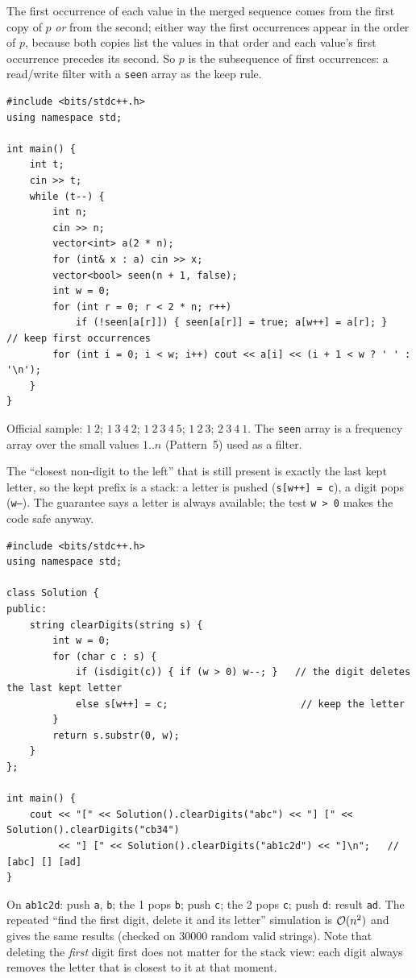 \begin{solutionbox}
The first occurrence of each value in the merged sequence comes from the first copy of $p$ \emph{or} from the second; either way the first occurrences appear in the order of $p$, because both copies list the values in that order and each value's first occurrence precedes its second. So $p$ is the subsequence of first occurrences: a read/write filter with a \texttt{seen} array as the keep rule.
\begin{lstlisting}[style=cpp]
#include <bits/stdc++.h>
using namespace std;

int main() {
    int t;
    cin >> t;
    while (t--) {
        int n;
        cin >> n;
        vector<int> a(2 * n);
        for (int& x : a) cin >> x;
        vector<bool> seen(n + 1, false);
        int w = 0;
        for (int r = 0; r < 2 * n; r++)
            if (!seen[a[r]]) { seen[a[r]] = true; a[w++] = a[r]; }   // keep first occurrences
        for (int i = 0; i < w; i++) cout << a[i] << (i + 1 < w ? ' ' : '\n');
    }
}
\end{lstlisting}
Official sample: $1\ 2$; $1\ 3\ 4\ 2$; $1\ 2\ 3\ 4\ 5$; $1\ 2\ 3$; $2\ 3\ 4\ 1$. The \texttt{seen} array is a frequency array over the small values $1..n$ (Pattern~5) used as a filter.
\end{solutionbox}

\begin{solutionbox}
The ``closest non-digit to the left'' that is still present is exactly the last kept letter, so the kept prefix is a stack: a letter is pushed (\texttt{s[w++] = c}), a digit pops (\texttt{w--}). The guarantee says a letter is always available; the test \texttt{w > 0} makes the code safe anyway.
\begin{lstlisting}[style=cpp]
#include <bits/stdc++.h>
using namespace std;

class Solution {
public:
    string clearDigits(string s) {
        int w = 0;
        for (char c : s) {
            if (isdigit(c)) { if (w > 0) w--; }   // the digit deletes the last kept letter
            else s[w++] = c;                       // keep the letter
        }
        return s.substr(0, w);
    }
};

int main() {
    cout << "[" << Solution().clearDigits("abc") << "] [" << Solution().clearDigits("cb34")
         << "] [" << Solution().clearDigits("ab1c2d") << "]\n";   // [abc] [] [ad]
}
\end{lstlisting}
On \texttt{ab1c2d}: push \texttt{a}, \texttt{b}; the 1 pops \texttt{b}; push \texttt{c}; the 2 pops \texttt{c}; push \texttt{d}: result \texttt{ad}. The repeated ``find the first digit, delete it and its letter'' simulation is $\mathcal{O}(n^2)$ and gives the same results (checked on 30000 random valid strings). Note that deleting the \emph{first} digit first does not matter for the stack view: each digit always removes the letter that is closest to it at that moment.
\end{solutionbox}

